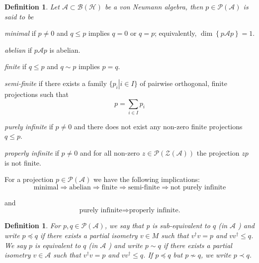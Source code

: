\documentclass[aps,preprint]{revtex4}%
\newtheorem{definition}[theorem]{Definition}
\begin{document}
\begin{definition}
Let $\mathcal{A}\subset\mathcal{B}(\mathcal{H})$ be a von Neumann algebra,
then $p\in\mathcal{P}(\mathcal{A})$ is said to be
\end{definition}

\textbullet\qquad\emph{minimal} if $p\neq0$ and $q\leq p$ implies $q=0$ or
$q=p$; equivalently, $\dim\left\{  p\mathcal{A}p\right\}  =1$.

\textbullet\qquad\emph{abelian} if $p\mathcal{A}p$ is abelian.

\textbullet\qquad\emph{finite} if $q\leq p$ and $q\sim p$ implies $p=q$.

\textbullet\qquad\emph{semi-finite} if there exists a family $\{\left.
p_{i}\right\vert i\in I\}$ of pairwise orthogonal, finite projections such
that
\begin{equation}
p=%
{\textstyle\sum\limits_{i\in I}}
p_{i}%
\end{equation}


\textbullet\qquad\emph{purely infinite} if $p\neq0$ and there does not exist
any non-zero finite projections $q\leq p$.

\textbullet\qquad\emph{properly infinite} if $p\neq0$ and for all non-zero
$z\in\mathcal{P}(\mathcal{Z}(\mathcal{A}))$ the projection $zp$ is not finite.

For a projection $p\in\mathcal{P}(\mathcal{A})$ we have the following
implications:%
\begin{equation}
\text{minimal}\Rightarrow\text{abelian}\Rightarrow\text{finite}\Rightarrow
\text{semi-finite}\Rightarrow\text{not purely infinite}%
\end{equation}


and%
\begin{equation}
\text{purely infinite}\Rightarrow\text{properly infinite.}%
\end{equation}


\begin{definition}
For $p,q\in\mathcal{P}(\mathcal{A})$, we say that p is sub-equivalent to $q$
(in $\mathcal{A}$ ) and write $p\preccurlyeq q$ if there exists a partial
isometry $v\in M$ such that $v^{\dagger}v=p$ and $vv^{\dagger}\leq q$. We say
$p$ is equivalent to $q$ (in $\mathcal{A}$ ) and write $p\sim q$ if there
exists a partial isometry $v\in\mathcal{A}$ such that $v^{\dagger}v=p$ and
$vv^{\dagger}\leq q$. If $p\preceq q$ but $p\nsim q$, we write $p\prec q$.
\end{definition}
\end{document}

